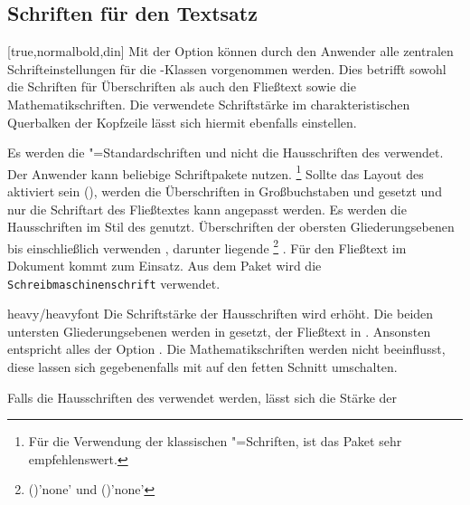 \begin{Declaration*}{}
\begin{Declaration*}{}
\begin{Declaration*}{}
\subsection{Schriften für den Textsatz}
%
%
%
\begin{Declaration}[%
  v2.02!\Option{cdfont=head};
  v2.02!\Option{cdfont=heavyhead};
  v2.03!\Option{cdfont=din};
  v2.03!\Option{cdfont=nodin};
  v2.05!\Option{cdfont=normalbold};
  v2.05!\Option{cdfont=ultrabold};
]{}[true,normalbold,din]%
\printdeclarationlist%
%
Mit der Option  können durch den Anwender alle zentralen 
Schrifteinstellungen für die \TUDScript-Klassen vorgenommen werden. Dies 
betrifft sowohl die Schriften für Überschriften als auch den Fließtext sowie 
die Mathematikschriften. Die verwendete Schriftstärke im charakteristischen 
Querbalken der Kopfzeile lässt sich hiermit ebenfalls einstellen. 
%
\begin{values}{}
\itemfalse
  Es werden die "=Standardschriften und nicht die Hausschriften 
  des \CDs verwendet. Der Anwender kann beliebige Schriftpakete nutzen.%
  \footnote{%
    Für die Verwendung der klassischen "=Schriften, ist das Paket 
     sehr empfehlenswert.%
  }
  Sollte das Layout des \CDs aktiviert sein (), werden die 
  Überschriften in Großbuchstaben und \DIN gesetzt und nur die Schriftart des 
  Fließtextes kann angepasst werden.
  Es werden die Hausschriften im Stil des \CDs genutzt. Überschriften der 
  obersten Gliederungsebenen bis einschließlich  
  verwenden \DIN, darunter liegende%
  \footnote{%
    ()'none' und 
    ()'none'%
  }
  . Für den Fließtext im Dokument kommt 
   zum Einsatz. Aus dem Paket  wird 
  die \texttt{Schreibmaschinenschrift} verwendet.
\item[heavy/heavyfont]
  Die Schriftstärke der Hausschriften wird erhöht. Die beiden untersten 
  Gliederungsebenen werden in  gesetzt, der Fließtext 
  in . Ansonsten entspricht alles der Option 
  . Die Mathematikschriften werden nicht beeinflusst, 
  diese lassen sich gegebenenfalls mit  auf den fetten Schnitt 
  umschalten.
\end{values}
%
Falls die Hausschriften des \TUDCDs verwendet werden, lässt sich die Stärke der 

\end{Declaration}
\end{Declaration*}
\end{Declaration*}
\end{Declaration*}
